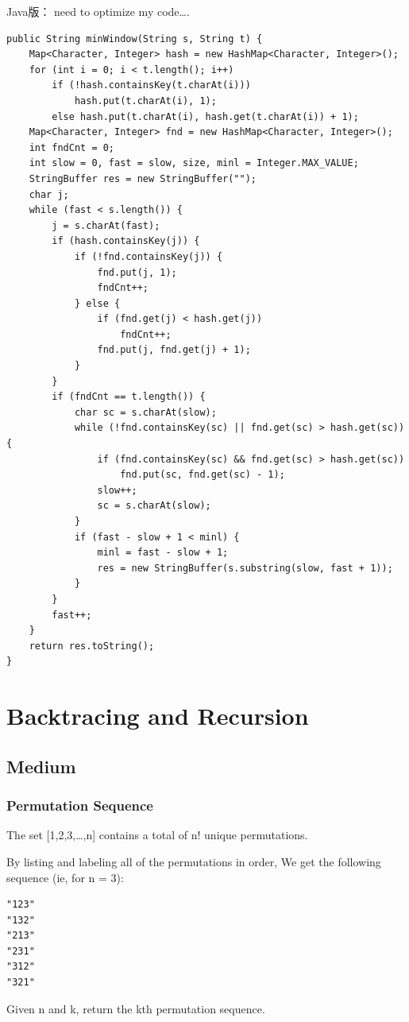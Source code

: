 \documentclass[12pt]{book}
\begin{document}
\begin{enumerate}
Java版： need to optimize my code\ldots{}.
\lstset{language=java,label= ,caption= ,numbers=none}
\begin{lstlisting}
public String minWindow(String s, String t) {
    Map<Character, Integer> hash = new HashMap<Character, Integer>();
    for (int i = 0; i < t.length(); i++) 
        if (!hash.containsKey(t.charAt(i)))
            hash.put(t.charAt(i), 1);
        else hash.put(t.charAt(i), hash.get(t.charAt(i)) + 1);
    Map<Character, Integer> fnd = new HashMap<Character, Integer>();
    int fndCnt = 0;
    int slow = 0, fast = slow, size, minl = Integer.MAX_VALUE;
    StringBuffer res = new StringBuffer("");
    char j;
    while (fast < s.length()) {
        j = s.charAt(fast);
        if (hash.containsKey(j)) {
            if (!fnd.containsKey(j)) {
                fnd.put(j, 1);
                fndCnt++;
            } else {
                if (fnd.get(j) < hash.get(j)) 
                    fndCnt++;
                fnd.put(j, fnd.get(j) + 1);  
            }
        }
        if (fndCnt == t.length()) {
            char sc = s.charAt(slow);
            while (!fnd.containsKey(sc) || fnd.get(sc) > hash.get(sc)) {
                if (fnd.containsKey(sc) && fnd.get(sc) > hash.get(sc))
                    fnd.put(sc, fnd.get(sc) - 1);
                slow++;
                sc = s.charAt(slow);
            }
            if (fast - slow + 1 < minl) {
                minl = fast - slow + 1;
                res = new StringBuffer(s.substring(slow, fast + 1));
            }
        }
        fast++;
    }
    return res.toString();
}
\end{lstlisting}
\end{enumerate}

\chapter{Backtracing and Recursion}
\label{sec-16}
\section{Medium}
\label{sec-16-1}
\subsection{Permutation Sequence}
\label{sec-16-1-1}
The set [1,2,3,…,n] contains a total of n! unique permutations.

By listing and labeling all of the permutations in order, We get the following sequence (ie, for n = 3):
\lstset{language=java,label= ,caption= ,numbers=none}
\begin{lstlisting}
"123"
"132"
"213"
"231"
"312"
"321"
\end{lstlisting}
Given n and k, return the kth permutation sequence.
\end{document}
